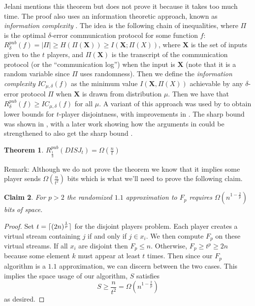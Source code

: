 \documentclass[11pt]{article}
\DeclarePairedDelimiter{\ceil}{\lceil}{\rceil}
\newtheorem{theorem}{Theorem}
\newtheorem{claim}[theorem]{Claim}
\begin{document}
Jelani mentions this theorem but does not prove it because it takes too much time.  The proof also uses an information theoretic approach, known as {\em information complexity} \cite{CSWY01}. The idea is the following chain of inequalities, where $\Pi$ is the optimal $\delta$-error communication protocol for some function $f$: $R^{pub}_\delta(f) = |\Pi| \ge H(\Pi(\mathbf{X})) \ge I(\mathbf{X};\Pi(X))$, where $\mathbf{X}$ is the set of inputs given to the $t$ players, and $\Pi(\mathbf{X})$ is the transcript of the communication protocol (or the ``communication log'') when the input is $\mathbf{X}$ (note that it is a random variable since $\Pi$ uses randomness). Then we define the {\em information complexity} $IC_{\mu,\delta}(f)$ as the minimum value $I(\mathbf{X},\Pi(X))$ achievable by any $\delta$-error protocol $\Pi$ when $\mathbf{X}$ is drawn from distribution $\mu$. Then we have that $R^{pub}_{\delta}(f) \ge IC_{\mu,\delta}(f)$ for all $\mu$. A variant of this approach was used by \cite{BJKS04} to obtain lower bounds for $t$-player disjointness, with improvements in \cite{CKS03}. The sharp bound was shown in \cite{G09}, with a later work showing how the arguments in \cite{BJKS04} could be strengthened to also get the sharp bound \cite{J09}. 

\begin{theorem}
$R_{\frac{1}{3}}^{pub}(DISJ_t) = \Omega(\frac{n}{t})$
\end{theorem}
Remark: Although we do not prove the theorem we know that it implies some player sends $\Omega(\frac{n}{t^2})$ bits which is what we'll need to prove the following claim.  

\begin{claim}
For $p > 2$ the randomized $1.1$ approximation to $F_p$ requires $\Omega(n^{1-\frac{2}{p}})$ bits of space.  
\end{claim}

\begin{proof}
Set $t = \ceil{(2n)^{\frac{1}{p}}}$ for the disjoint players problem.  Each player creates a virtual stream containing $j$ if and only if $j \in x_i$.  We then compute $F_p$ on these virtual streams.  If all $x_i$ are disjoint then $F_p \leq n$.  Otherwise, $F_p \geq t^p \geq 2n$ because some element $k$ must appear at least $t$ times.  Then since our $F_p$ algorithm is a $1.1$ approximation, we can discern between the two cases.  This implies the space usage of our algorithm, $S$ satisfies
$$S \geq \frac{n}{t^2} = \Omega(n^{1 - \frac{2}{p}})$$
as desired.     
\end{proof}
\end{document}

